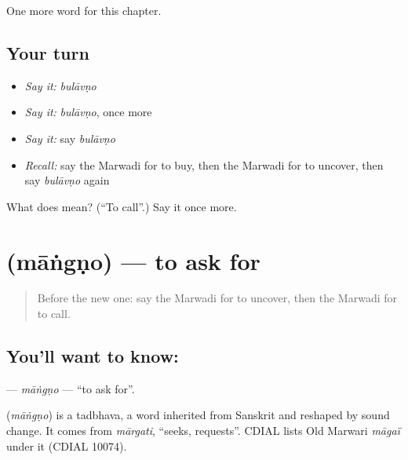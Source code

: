 \begin{grammarlens}[title={What you've built}]
One more word for this chapter.
\end{grammarlens}

\subsection*{Your turn}
\begin{itemize}
\raggedright
  \item \emph{Say it:} \emph{bulāvṇo}
  \item \emph{Say it:} \emph{bulāvṇo}, once more
  \item \emph{Say it:} say \emph{bulāvṇo}
  \item \emph{Recall:} say the Marwadi for to buy, then the Marwadi for to uncover, then say \emph{bulāvṇo} again
\end{itemize}

\begin{tcolorbox}[breakable,colback=teal!4,colframe=teal!35!black,title={Before you move on}]
What does  mean? (\textquotedblleft{}To call\textquotedblright{}.) Say it once more.
\end{tcolorbox}
\section[\texorpdfstring{\mw{मांगणो} (māṅgṇo)}{मांगणो (māṅgṇo)}]{ (māṅgṇo) — to ask for}

\label{lesson:MW-C104-mangno}



\begin{quote}
Before the new one: say the Marwadi for to uncover, then the Marwadi for to call.
\end{quote}

\subsection*{You'll want to know: }
\textbf{} — \emph{māṅgṇo} — \textquotedblleft{}to ask for\textquotedblright{}.

\begin{cousinweb}
\textbf{} (\emph{māṅgṇo}) is a tadbhava, a word inherited from Sanskrit and reshaped by sound change. It comes from \emph{mārgati}, \textquotedblleft{}seeks, requests\textquotedblright{}. CDIAL lists Old Marwari \emph{māgaï} under it (CDIAL 10074).
\end{cousinweb}

